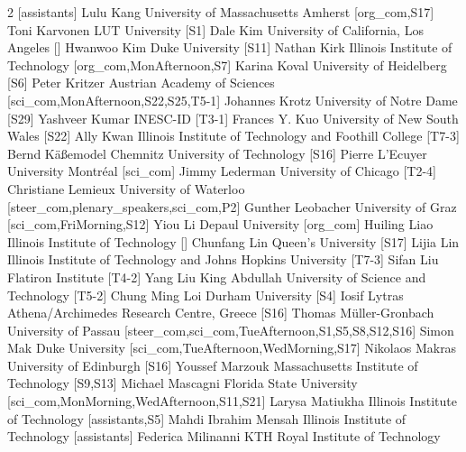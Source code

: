 \begin{multicols}{2}
  [assistants]
\participantne
  {Lulu Kang}
  {University of Massachusetts Amherst}
  [org_com,S17]
\participantne
  {Toni Karvonen}
  {LUT University}
  [S1]
\participantne
  {Dale Kim}
  {University of California, Los Angeles}
  []
\participantne
  {Hwanwoo Kim}
  {Duke University}
  [S11]
\participantne
  {Nathan Kirk}
  {Illinois Institute of Technology}
  [org_com,MonAfternoon,S7]
\participantne
  {Karina Koval}
  {University of Heidelberg}
  [S6]
\participantne
  {Peter Kritzer}
  {Austrian Academy of Sciences}
  [sci_com,MonAfternoon,S22,S25,T5-1]
\participantne
  {Johannes Krotz}
  {University of Notre Dame}
  [S29]
\participantne
  {Yashveer Kumar}
  {INESC-ID}
  [T3-1]
\participantne
  {Frances Y. Kuo}
  {University of New South Wales}
  [S22]
\participantne
  {Ally Kwan}
  {Illinois Institute of Technology and Foothill College}
  [T7-3]
\participantne
  {Bernd K\"a{\ss}emodel}
  {Chemnitz University of Technology}
  [S16]
\participantne
  {Pierre L'Ecuyer}
  {University Montr\'eal}
  [sci_com]
\participantne
  {Jimmy Lederman}
  {University of Chicago}
  [T2-4]
\participantne
  {Christiane Lemieux}
  {University of Waterloo}
  [steer_com,plenary_speakers,sci_com,P2]
\participantne
  {Gunther Leobacher}
  {University of Graz}
  [sci_com,FriMorning,S12]
\participantne
  {Yiou Li}
  {Depaul University}
  [org_com]
\participantne
  {Huiling Liao}
  {Illinois Institute of Technology}
  []
\participantne
  {Chunfang Lin}
  {Queen's University}
  [S17]
\participantne
  {Lijia Lin}
  {Illinois Institute of Technology and Johns Hopkins University}
  [T7-3]
\participantne
  {Sifan Liu}
  {Flatiron Institute}
  [T4-2]
\participantne
  {Yang Liu}
  {King Abdullah University of Science and Technology}
  [T5-2]
\participantne
  {Chung Ming Loi}
  {Durham University}
  [S4]
\participantne
  {Iosif Lytras}
  {Athena/Archimedes Research Centre, Greece}
  [S16]
\participantne
  {Thomas M\"uller-Gronbach}
  {University of Passau}
  [steer_com,sci_com,TueAfternoon,S1,S5,S8,S12,S16]
\participantne
  {Simon Mak}
  {Duke University}
  [sci_com,TueAfternoon,WedMorning,S17]
\participantne
  {Nikolaos Makras}
  {University of Edinburgh}
  [S16]
\participantne
  {Youssef Marzouk}
  {Massachusetts Institute of Technology}
  [S9,S13]
\participantne
  {Michael Mascagni}
  {Florida State University}
  [sci_com,MonMorning,WedAfternoon,S11,S21]
\participantne
  {Larysa Matiukha}
  {Illinois Institute of Technology}
  [assistants,S5]
\participantne
  {Mahdi Ibrahim Mensah}
  {Illinois Institute of Technology}
  [assistants]
\participantne
  {Federica Milinanni}
  {KTH Royal Institute of Technology}

\end{multicols}
